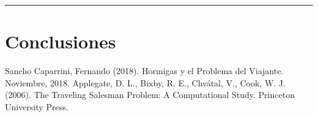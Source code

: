 \documentclass[twocolumn, fontsize=10pt]{article}
\begin{document}
\rule{\linewidth}{0.5pt}

\section{Conclusiones}

\renewcommand\refname{Referencias}

\begin{thebibliography}{}

  \sloppypar
   Sancho Caparrini, Fernando (2018). Hormigas y el Problema del Viajante. Noviembre, 2018.  
   Applegate, D. L., Bixby, R. E., Chvátal, V.,  Cook, W. J. (2006). The Traveling Salesman Problem: A Computational Study. Princeton University Press.  
\end{thebibliography}
\end{document}
